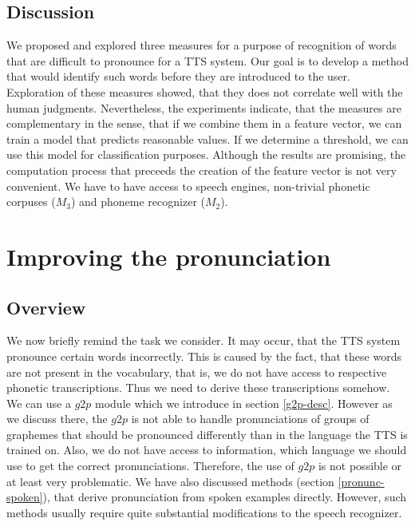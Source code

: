 \subsection{Discussion}
We proposed and explored three measures for a purpose of recognition of words that are difficult to pronounce for a TTS system.
Our goal is to develop a method that would identify such words before they are introduced to the user.
Exploration of these measures showed, that they does not correlate well with the human judgments.
Nevertheless, the experiments indicate, that the measures are complementary in the sense, that if we combine them in a feature vector, we can train a model that predicts reasonable values.
If we determine a threshold, we can use this model for classification purposes.
Although the results are promising, the computation process that preceeds the creation of the feature vector is not very convenient.
We have to have access to speech engines, non-trivial phonetic corpuses ($M_3$) and phoneme recognizer ($M_2$).
\section{Improving the pronunciation}
\label{pron-improvement}
\subsection{Overview}
We now briefly remind the task we consider.
It may occur, that the TTS system pronounce certain words incorrectly.
This is caused by the fact, that these words are not present in the vocabulary, that is, we do not have access to respective phonetic transcriptions.
Thus we need to derive these transcriptions somehow.
We can use a $g2p$ module which we introduce in section \ref{g2p-desc}.
However as we discuss there, the $g2p$ is not able to handle pronunciations of groups of graphemes that should be pronounced differently than in the language the TTS is trained on.
Also, we do not have access to information, which language we should use to get the correct pronunciations.
Therefore, the use of $g2p$ is not possible or at least very problematic.
We have also discussed methods (section \ref{pronunc-spoken}), that derive pronunciation from spoken examples directly.
However, such methods usually require quite substantial modifications to the speech recognizer.
